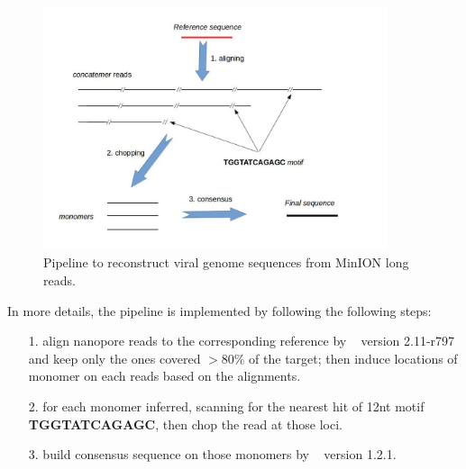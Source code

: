 \begin{figure}[ht]
\centerline{\includegraphics[width=0.9\textwidth]{images/concatemer.jpg}}
\caption{Pipeline to reconstruct viral genome sequences from MinION long reads.}
\label{fig:concat_ref_workflow}
\end{figure}

In more details, the pipeline is implemented by following the following steps: 
\begin{itemize}
\item[1.] align nanopore reads to the corresponding reference by \minimap{}~\cite{Li2016} version 2.11-r797 and keep only the ones covered $>80\%$ of the target; then induce locations of monomer on each reads based on the alignments.
\item[2.] for each monomer inferred, scanning for the nearest hit of 12nt motif \\\textbf{TGGTATCAGAGC}, then chop the read at those loci.
\item[3.] build consensus sequence on those monomers by \racon{}~\cite{Vaser2017racon} version 1.2.1.
\end{itemize}

